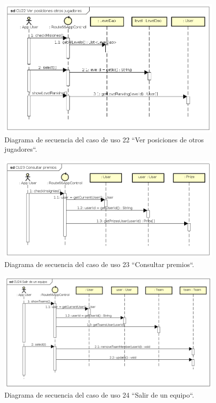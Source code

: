 \documentclass[twoside]{report}
\begin{document}
\begin{figure}[H]
\begin{center}
\includegraphics[width=\textwidth]{images/sequence/CU22}
\caption{Diagrama de secuencia del caso de uso 22 “Ver posiciones de otros jugadores“.}
\end{center}
\end{figure}

\begin{figure}[H]
\begin{center}
\includegraphics[width=\textwidth]{images/sequence/CU23}
\caption{Diagrama de secuencia del caso de uso 23 “Consultar premios“.}
\end{center}
\end{figure}

\begin{figure}[H]
\begin{center}
\includegraphics[width=\textwidth]{images/sequence/CU24}
\caption{Diagrama de secuencia del caso de uso 24 “Salir de un equipo“.}
\end{center}
\end{figure}
\end{document}

